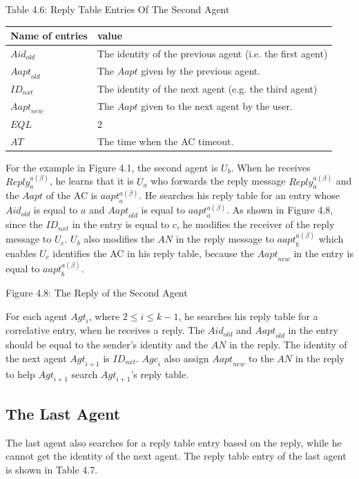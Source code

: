 Table 4.6: Reply Table Entries Of The Second Agent

\begin{tabular}{|p{1.0in}|p{2.5in}|} \hline 
Name of entries & value \\ \hline 
${Aid}_{old}$ & The identity of the previous agent (i.e. the first agent) \\ \hline 
${Aapt}_{old}$ & The $Aapt$ given by the previous agent. \\ \hline 
${ID}_{nxt}$ & The identity of the next agent (e.g. the third agent) \\ \hline 
${Aapt}_{new}$ & The $Aapt$ given to the next agent by the user. \\ \hline 
$EQL$ & 2 \\ \hline 
$AT$ & The time when the AC timeout. \\ \hline 
\end{tabular}

For the example in Figure 4.1, the second agent is $U_b$. When he receives ${Reply}^{a\left(\beta\right)}_a$, he learns that it is $U_a$ who forwards the reply message ${Reply}^{a\left(\beta\right)}_a$ and the $Aapt$ of the AC is ${aapt}^{a\left(\beta\right)}_a$. He searches his reply table for an entry whose ${Aid}_{old}$ is equal to $a$ and ${Aapt}_{old}$ is equal to ${aapt}^{a\left(\beta\right)}_a$. As shown in Figure 4.8, since the ${ID}_{nxt}$ in the entry is equal to $c$, he modifies the receiver of the reply message to $U_c$. $U_b$ also modifies the $AN$ in the reply message to ${aapt}^{a\left(\beta\right)}_b$ which enables $U_c$ identifies the AC in his reply table, because the ${Aapt}_{new}$ in the entry is equal to ${aapt}^{a\left(\beta\right)}_b$. 

Figure 4.8: The Reply of the Second Agent

For each agent ${Agt}_i$, where $2\le i\le k-1$, he searches his reply table for a correlative entry, when he receives a reply. The ${Aid}_{old}$ and ${Aapt}_{old}$ in the entry should be equal to the sender's identity and the $AN$ in the reply. The identity of the next agent ${Agt}_{i+1}$ is ${ID}_{nxt}$. ${Agc}_i$ also assign ${Aapt}_{new}$ to the $AN$ in the reply to help ${Agt}_{i+1}$ search ${Agt}_{i+1}$'s reply table.

\subsection{ The Last Agent}

\noindent The last agent also searches for a reply table entry based on the reply, while he cannot get the identity of the next agent. The reply table entry of the last agent is shown in Table 4.7.

